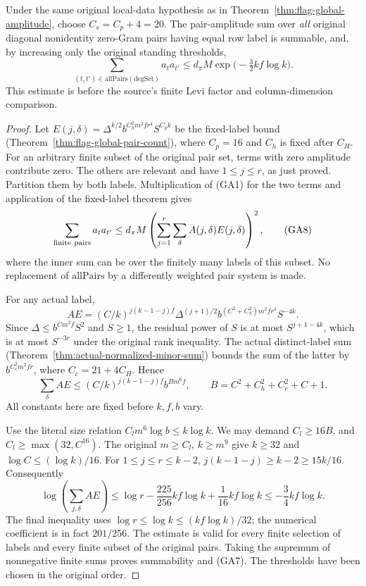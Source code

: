 \begin{theorem}
\label{thm:flag-global-amplitude-sum}
Under the same original local-data hypothesis as in
Theorem~\ref{thm:flag-global-amplitude}, choose \(C_s=C_p+4=20\).
The pair-amplitude sum over \emph{all} original diagonal
nonidentity zero-Gram pairs having equal row label is summable,
and, by increasing only the original standing thresholds,
\[
 \sum_{(t,t')\in\mathrm{allPairs}(\mathrm{degSet})}
                       a_t a_{t'}
   \le d_\pi M \exp\bigl(-\tfrac32 kf\log k\bigr).
 \tag{GA7}
\]
This estimate is before the source's finite Levi factor and
column-dimension comparison.
\end{theorem}
\begin{proof}
Let \(E(j,\delta)=\Delta^{k/2}b^{C_h^2m^2fr^4}S^{C_p k}\)
be the fixed-label bound (Theorem~\ref{thm:flag-global-pair-count}),
where \(C_p=16\) and \(C_h\) is fixed after \(C_H\).
For an arbitrary finite subset of the original pair set, terms
with zero amplitude contribute zero. The others are relevant
and have \(1\le j\le r\), as just proved. Partition them by
both labels. Multiplication of (GA1) for the two terms and
application of the fixed-label theorem gives
\[
 \sum_{\rm finite\ pairs}a_ta_{t'}
 \le d_\pi M
        \left(\sum_{j=1}^r\sum_{\delta}
                              A(j,\delta)E(j,\delta)\right)^2 ,
 \tag{GA8}
\]
where the inner sum can be over the finitely many labels of
this subset. No replacement of \(\mathrm{allPairs}\) by
a differently weighted pair system is made.

For any actual label,
\[
 AE=(C/k)^{j(k-1-j)f}
          \Delta^{(j+1)/2}
          b^{(C^2+C_h^2)m^2fr^4}S^{-4k}.
\]
Since \(\Delta\le b^{Cm^2f}S^2\) and \(S\ge1\),
the residual power of \(S\) is at most \(S^{j+1-4k}\),
which is at most \(S^{-3r}\) under the original rank
inequality. The actual distinct-label sum
(Theorem~\ref{thm:actual-normalized-minor-sum}) bounds
the sum of the latter by \(b^{C_c^2m^2fr}\),
where \(C_c=21+4C_H\). Hence
\[
 \sum_\delta AE
 \le (C/k)^{j(k-1-j)f} b^{B m^6 f},
 \qquad B=C^2+C_h^2+C_c^2+C+1 .
\]
All constants here are fixed before \(k,f,b\) vary.

Use the literal size relation \(C_l m^6\log b\le k\log k\).
We may demand \(C_l\ge16B\), and \(C_l\ge\max(32,C^{16})\).
The original \(m\ge C_l\), \(k\ge m^9\) give
\(k\ge32\) and \(\log C\le(\log k)/16\).
For \(1\le j\le r\le k-2\),
\(j(k-1-j)\ge k-2\ge15k/16\).
Consequently
\[
 \log\left(\sum_{j,\delta}AE\right)
 \le \log r-\frac{225}{256}kf\log k+\frac1{16}kf\log k
 \le -\frac34 kf\log k .
\]
The final inequality uses \(\log r\le\log k\le(kf\log k)/32\);
the numerical coefficient is in fact \(201/256\).
The estimate is valid for every finite selection of labels
and every finite subset of the original pairs. Taking the
supremum of nonnegative finite sums proves summability and (GA7).
The thresholds have been chosen in the original order.
\end{proof}

